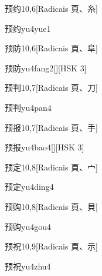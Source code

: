 \begin{entry}{预约}{10,6}[Radicais ⾴、⽷]
  \begin{phonetics}{预约}{yu4yue1}
  \end{phonetics}
\end{entry}

\begin{entry}{预防}{10,6}[Radicais ⾴、⾩]
  \begin{phonetics}{预防}{yu4fang2}[][HSK 3]
  \end{phonetics}
\end{entry}

\begin{entry}{预判}{10,7}[Radicais ⾴、⼑]
  \begin{phonetics}{预判}{yu4pan4}
  \end{phonetics}
\end{entry}

\begin{entry}{预报}{10,7}[Radicais ⾴、⼿]
  \begin{phonetics}{预报}{yu4bao4}[][HSK 3]
  \end{phonetics}
\end{entry}

\begin{entry}{预定}{10,8}[Radicais ⾴、⼧]
  \begin{phonetics}{预定}{yu4ding4}
  \end{phonetics}
\end{entry}

\begin{entry}{预购}{10,8}[Radicais ⾴、⾙]
  \begin{phonetics}{预购}{yu4gou4}
  \end{phonetics}
\end{entry}

\begin{entry}{预祝}{10,9}[Radicais ⾴、⽰]
  \begin{phonetics}{预祝}{yu4zhu4}
  \end{phonetics}
\end{entry}

